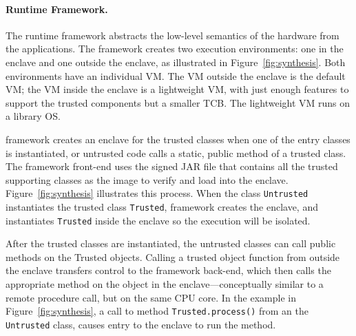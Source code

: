




\paragraph{\sysname{} Runtime Framework.}
The \sysname{} runtime framework abstracts the low-level semantics of the \sgx{} hardware from the applications.
The \sysname{} framework creates two \java{} execution environments: 
one in the enclave and one outside the enclave, as illustrated in Figure~\ref{fig:synthesis}.
Both environments have an individual \java{} VM.
The \java{} VM outside the enclave is the default \java{} VM; the \java{} VM inside the enclave is a lightweight \java{} VM,
with just enough features to support the trusted components but a smaller TCB.
The lightweight \java{} VM runs on a library OS.

 
\sysname{} framework creates an enclave for the trusted classes
when one of the entry classes is instantiated,
or untrusted code calls a static, public method of a trusted class.
The \sysname{} framework front-end uses the signed JAR file that
contains all the trusted supporting classes
as the image to verify and load into the enclave.
Figure~\ref{fig:synthesis} illustrates this process.
When the class {\tt Untrusted} instantiates the trusted class {\tt Trusted},
\sysname{} framework creates the enclave,
and instantiates {\tt Trusted} inside the enclave so the execution will be isolated.


After the trusted classes are instantiated, the untrusted classes can call public methods on the Trusted objects.
Calling a trusted object function from outside the enclave transfers control to the \sysname{} framework back-end, which then 
calls the appropriate method on the object in the enclave---conceptually similar to a remote procedure call, but on the same CPU core.
In the example in Figure~\ref{fig:synthesis}, a call to method {\tt Trusted.process()} from an the {\tt Untrusted} class,
causes entry to the enclave to run the method.

